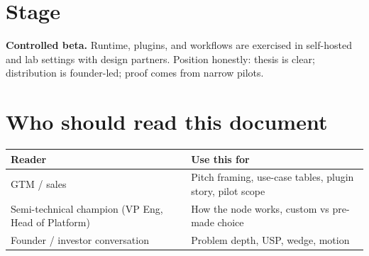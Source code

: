 \section{Stage}

\textbf{Controlled beta.} Runtime, plugins, and workflows are exercised in self-hosted and lab settings with design partners. Position honestly: thesis is clear; distribution is founder-led; proof comes from narrow pilots.

\section{Who should read this document}

\begin{tabularx}{\textwidth}{@{}lX@{}}
\toprule
\textbf{Reader} & \textbf{Use this for} \\
\midrule
GTM / sales & Pitch framing, use-case tables, plugin story, pilot scope \\
Semi-technical champion (VP Eng, Head of Platform) & How the node works, custom vs pre-made choice \\
Founder / investor conversation & Problem depth, USP, wedge, motion \\
\bottomrule
\end{tabularx}
